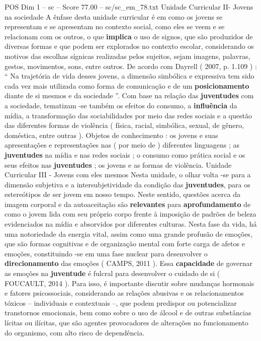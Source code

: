 \begin{textsample}{POS Dim 1 – sc – Score 77.00 – sc/sc\_em\_78.txt}
Unidade Curricular II- Jovens na sociedade A ênfase desta unidade curricular é em como os jovens se representam e se apresentam no contexto social, como eles se veem e se relacionam com os outros, o que \textbf{implica} o uso de signos, que são produzidos de diversas formas e que podem ser explorados no contexto escolar, considerando os motivos das escolhas sígnicas realizadas pelos sujeitos, sejam imagens, palavras, gestos, movimentos, sons, entre outros.
De acordo com Dayrell ( 2007, p. 1.109 ) : “ Na trajetória de vida desses jovens, a dimensão simbólica e expressiva tem sido cada vez mais utilizada como forma de comunicação e de um \textbf{posicionamento} diante de si mesmos e da sociedade ”.
Com base na relação das \textbf{juventudes} com a sociedade, tematizam -se também os efeitos do consumo, a \textbf{influência} da mídia, a transformação das sociabilidades por meio das redes sociais e a questão das diferentes formas de violência ( física, racial, simbólica, sexual, de gênero, doméstica, entre outras ).
Objetos de conhecimento : os jovens e suas apresentações e representações nas ( por meio de ) diferentes linguagens ; as \textbf{juventudes} na mídia e nas redes sociais ; o consumo como prática social e os seus efeitos nas \textbf{juventudes} ; os jovens e as formas de violência.
Unidade Curricular III - Jovens com eles mesmos Nesta unidade, o olhar volta -se para a dimensão subjetiva e a intersubjetividade da condição das \textbf{juventudes}, para os estereótipos de ser jovem em nosso tempo.
Neste sentido, questões acerca da imagem corporal e da autoaceitação são \textbf{relevantes} para \textbf{aprofundamento} de como o jovem lida com seu próprio corpo frente à imposição de padrões de beleza evidenciados na mídia e absorvidos por diferentes culturas.
Nesta fase da vida, há uma notoriedade da energia vital, assim como uma grande profusão de emoções, que são formas cognitivas e de organização mental com forte carga de afetos e emoções, constituindo -se em uma fase nuclear para desenvolver o \textbf{direcionamento} das emoções ( CAMPS, 2011 ).
Essa \textbf{capacidade} de governar as emoções na \textbf{juventude} é fulcral para desenvolver o cuidado de si ( FOUCAULT, 2014 ).
Para isso, é importante discutir sobre mudanças hormonais e fatores psicossociais, considerando as relações abusivas e os relacionamentos tóxicos – individuais e contextuais –, que podem predispor ou potencializar transtornos emocionais, bem como sobre o uso de álcool e de outras substâncias lícitas ou ilícitas, que são agentes provocadores de alterações no funcionamento do organismo, com alto risco de dependência.

\end{textsample}
